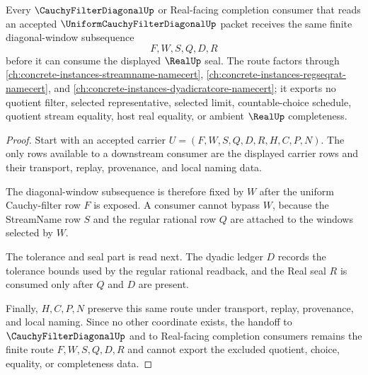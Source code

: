 \begin{theorem}
\label{thm:uniform-cauchy-filter-diagonal-window-subsequence}
Every $\CauchyFilterDiagonalUp$ or Real-facing completion consumer that reads an accepted $\UniformCauchyFilterDiagonalUp$ packet receives the same finite diagonal-window subsequence
$$
F,W,S,Q,D,R
$$
before it can consume the displayed $\RealUp$ seal. The route factors through \autoref{ch:concrete-instances-streamname-namecert}, \autoref{ch:concrete-instances-regseqrat-namecert}, and \autoref{ch:concrete-instances-dyadicratcore-namecert}; it exports no quotient filter, selected representative, selected limit, countable-choice schedule, quotient stream equality, host real equality, or ambient $\RealUp$ completeness.
\end{theorem}
\begin{proof}
Start with an accepted carrier $U=(F,W,S,Q,D,R,H,C,P,N)$. The only rows available to a downstream consumer are the displayed carrier rows and their transport, replay, provenance, and local naming data.

The diagonal-window subsequence is therefore fixed by $W$ after the uniform Cauchy-filter row $F$ is exposed. A consumer cannot bypass $W$, because the StreamName row $S$ and the regular rational row $Q$ are attached to the windows selected by $W$.

The tolerance and seal part is read next. The dyadic ledger $D$ records the tolerance bounds used by the regular rational readback, and the Real seal $R$ is consumed only after $Q$ and $D$ are present.

Finally, $H,C,P,N$ preserve this same route under transport, replay, provenance, and local naming. Since no other coordinate exists, the handoff to $\CauchyFilterDiagonalUp$ and to Real-facing completion consumers remains the finite route $F,W,S,Q,D,R$ and cannot export the excluded quotient, choice, equality, or completeness data.
\end{proof}



